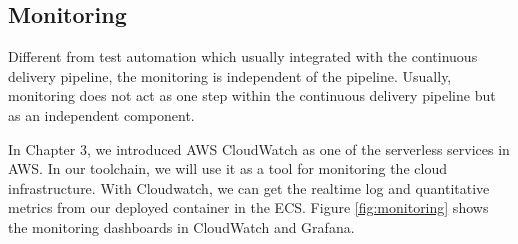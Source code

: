 \subsection{Monitoring}
Different from test automation which usually integrated with the continuous delivery pipeline, the monitoring is independent of the pipeline. Usually, monitoring does not act as one step within the continuous delivery pipeline but as an independent component.
\par
In Chapter 3, we introduced AWS CloudWatch as one of the serverless services in AWS. In our toolchain, we will use it as a tool for monitoring the cloud infrastructure. With Cloudwatch, we can get the realtime log and quantitative metrics from our deployed container in the ECS. Figure \ref{fig:monitoring} shows the monitoring dashboards in CloudWatch and Grafana.
